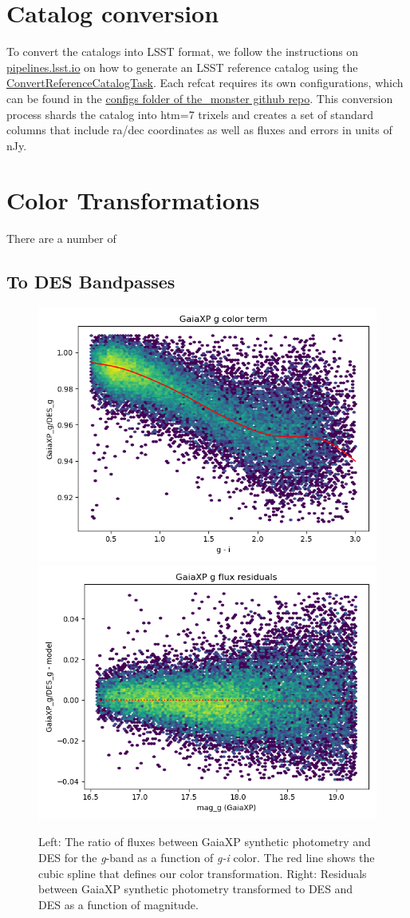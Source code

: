 \section{Catalog conversion}
\label{sec:conversion}
To convert the catalogs into LSST format, we follow the instructions on \href{https://pipelines.lsst.io/modules/lsst.meas.algorithms/creating-a-reference-catalog.html}{pipelines.lsst.io} on how to generate an LSST reference catalog using the \href{https://pipelines.lsst.io/modules/lsst.meas.algorithms/tasks/lsst.meas.algorithms.ConvertReferenceCatalogTask.html#lsst-task-lsst-meas-algorithms-convertreferencecatalog-convertreferencecatalogtask}{ConvertReferenceCatalogTask}. Each refcat requires its own configurations, which can be found in the \href{https://github.com/lsst-dm/the_monster/tree/main/configs}{configs folder of the\_monster github repo}.
This conversion process shards the catalog into htm=7 trixels and creates a set of standard columns that include ra/dec coordinates as well as fluxes and errors in units of nJy.

\section{Color Transformations}
\label{sec:colors}
There are a number of
\subsection{To DES Bandpasses}
\begin{figure}
    \includegraphics[width=0.49\linewidth]{./figures/color_terms/GaiaXP_to_DES_band_g_color_term.png}
    \includegraphics[width=0.49\linewidth]{./figures/color_terms/GaiaXP_to_DES_band_g_flux_residuals.png}
    \caption{Left: The ratio of fluxes between GaiaXP synthetic photometry and DES for the \textit{g}-band as a function of \textit{g-i} color. The red line shows the cubic spline that defines our color transformation.
    Right: Residuals between GaiaXP synthetic photometry transformed to DES and DES as a function of magnitude.}
\end{figure}
